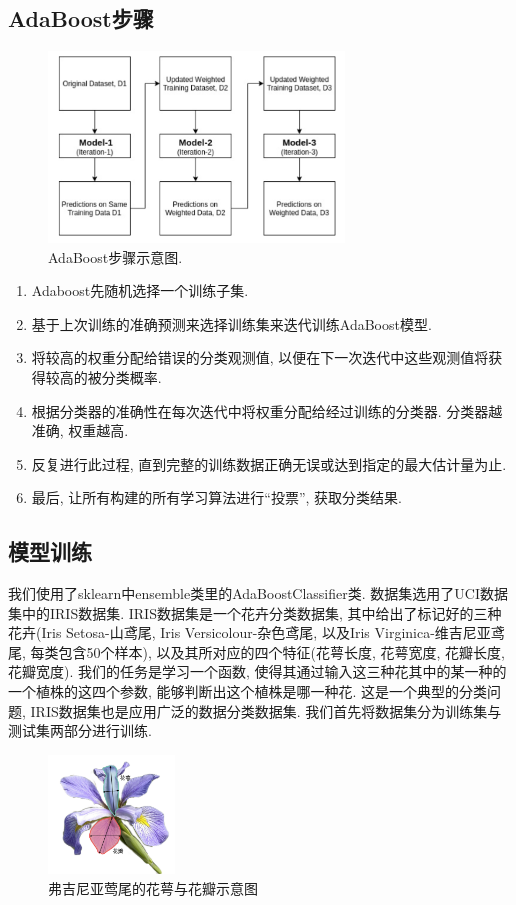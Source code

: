 \documentclass[lang=cn,11pt]{elegantpaper}
\begin{document}
\subsection{AdaBoost步骤}
\begin{figure}[htbp]
  \centering
  \includegraphics[width=0.7\textwidth]{3}
  \caption{AdaBoost步骤示意图.}
\end{figure}
\begin{enumerate}
  \item Adaboost先随机选择一个训练子集. 
  \item 基于上次训练的准确预测来选择训练集来迭代训练AdaBoost模型. 
  \item 将较高的权重分配给错误的分类观测值, 以便在下一次迭代中这些观测值将获得较高的被分类概率. 
  \item 根据分类器的准确性在每次迭代中将权重分配给经过训练的分类器. 分类器越准确, 权重越高. 
  \item 反复进行此过程, 直到完整的训练数据正确无误或达到指定的最大估计量为止. 
  \item 最后, 让所有构建的所有学习算法进行“投票”, 获取分类结果.   
\end{enumerate}
\subsection{模型训练}
我们使用了sklearn中ensemble类里的AdaBoostClassifier类. 数据集选用了UCI数据集中的IRIS数据集. IRIS数据集是一个花卉分类数据集, 其中给出了标记好的三种花卉(Iris Setosa-山鸢尾, Iris Versicolour-杂色鸢尾, 以及Iris Virginica-维吉尼亚鸢尾, 每类包含50个样本), 以及其所对应的四个特征(花萼长度, 花萼宽度, 花瓣长度, 花瓣宽度). 我们的任务是学习一个函数, 使得其通过输入这三种花其中的某一种的一个植株的这四个参数, 能够判断出这个植株是哪一种花. 这是一个典型的分类问题, IRIS数据集也是应用广泛的数据分类数据集. 我们首先将数据集分为训练集与测试集两部分进行训练.

\begin{figure}[htbp]
\centering
  \includegraphics[width=0.3\textwidth]{flower.png}
  \caption{弗吉尼亚莺尾的花萼与花瓣示意图\label{fig:VGflower}}
\end{figure}
\end{document}
